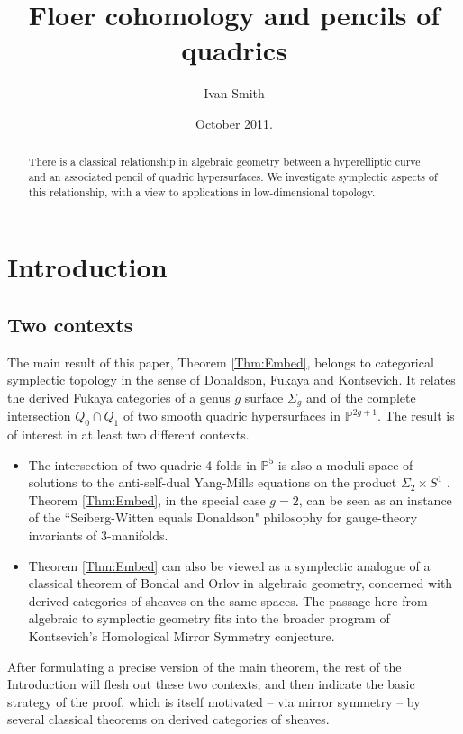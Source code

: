\documentclass[reqno,10pt]{amsart}
\title[{Floer cohomology and pencils of quadrics}]{Floer cohomology and pencils of quadrics}
\author[Ivan Smith]{Ivan Smith} \date{October 2011.}
\numberwithin{equation}{section}
\newcommand{\bP}{{\mathbb P}}
\theoremstyle{remark}
\begin{document}
\begin{abstract}
There is a classical relationship in algebraic geometry between a hyperelliptic curve and an associated pencil of quadric hypersurfaces.  We investigate symplectic aspects  of this relationship, with a view to applications in low-dimensional topology.
\end{abstract}

\maketitle
\begin{footnotesize}
\setcounter{tocdepth}{2}
\tableofcontents
\end{footnotesize}

\section{Introduction}


\subsection{Two contexts}  The main result of this paper, Theorem \ref{Thm:Embed},  belongs to categorical symplectic topology in the sense of Donaldson, Fukaya and Kontsevich.  It relates the derived Fukaya categories of a genus $g$ surface $\Sigma_g$ and of the complete intersection $Q_0 \cap Q_1$ of two smooth quadric hypersurfaces in $\bP^{2g+1}$.  The result is of interest in at least two different contexts.

\begin{itemize}
\item The intersection of two quadric 4-folds in $\bP^5$ is also a moduli space of solutions to the anti-self-dual Yang-Mills equations on the product $\Sigma_2 \times S^1$ \cite{Newstead, NS}.  Theorem \ref{Thm:Embed}, in the special case $g=2$, can be seen as an instance of the ``Seiberg-Witten equals Donaldson" philosophy for gauge-theory invariants of 3-manifolds.

\item Theorem \ref{Thm:Embed} can also be viewed as a symplectic analogue of a classical theorem of Bondal and Orlov \cite{BondalOrlov} in algebraic geometry, concerned with derived categories of sheaves on the same spaces.  The passage here from algebraic to symplectic geometry fits into the broader program of Kontsevich's Homological Mirror Symmetry conjecture.
 \end{itemize}
 After formulating a precise version of the main theorem, the rest of the Introduction will flesh out these two contexts, and then indicate the basic strategy of the proof,  which is itself motivated -- via mirror symmetry -- by several classical theorems on derived categories of sheaves.  
\end{document}
